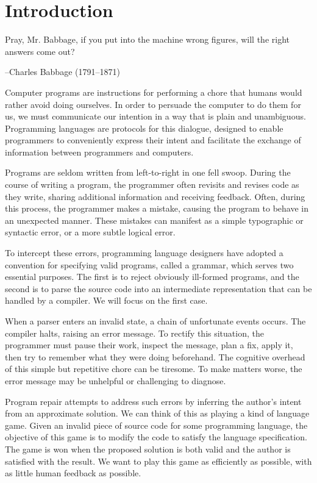 \chapter{\rm\bfseries Introduction}
\label{ch:introduction}

\epigraph{Pray, Mr. Babbage, if you put into the machine wrong figures, will the right answers come out?}{--Charles Babbage (1791--1871)}


Computer programs are instructions for performing a chore that humans would rather avoid doing ourselves. In order to persuade the computer to do them for us, we must communicate our intention in a way that is plain and unambiguous. Programming languages are protocols for this dialogue, designed to enable programmers to conveniently express their intent and facilitate the exchange of information between programmers and computers.

Programs are seldom written from left-to-right in one fell swoop. During the course of writing a program, the programmer often revisits and revises code as they write, sharing additional information and receiving feedback. Often, during this process, the programmer makes a mistake, causing the program to behave in an unexpected manner. These mistakes can manifest as a simple typographic or syntactic error, or a more subtle logical error.

To intercept these errors, programming language designers have adopted a convention for specifying valid programs, called a grammar, which serves two essential purposes. The first is to reject obviously ill-formed programs, and the second is to parse the source code into an intermediate representation that can be handled by a compiler. We will focus on the first case.

When a parser enters an invalid state, a chain of unfortunate events occurs. The compiler halts, raising an error message. To rectify this situation, the programmer must pause their work, inspect the message, plan a fix, apply it, then try to remember what they were doing beforehand. The cognitive overhead of this simple but repetitive chore can be tiresome. To make matters worse, the error message may be unhelpful or challenging to diagnose.

Program repair attempts to address such errors by inferring the author's intent from an approximate solution. We can think of this as playing a kind of language game. Given an invalid piece of source code for some programming language, the objective of this game is to modify the code to satisfy the language specification. The game is won when the proposed solution is both valid and the author is satisfied with the result. We want to play this game as efficiently as possible, with as little human feedback as possible.

